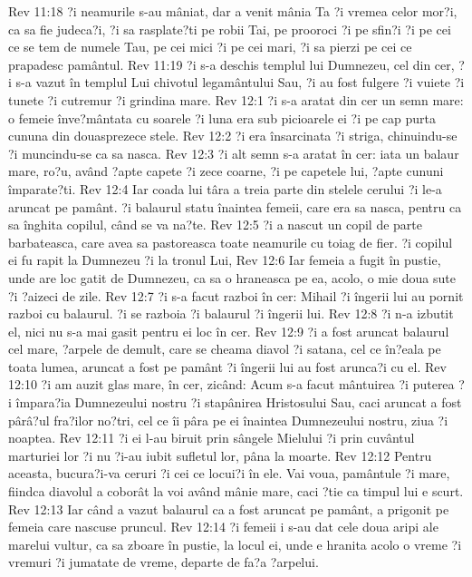Rev 11:18  ?i neamurile s-au mâniat, dar a venit mânia Ta ?i vremea celor mor?i, ca sa fie judeca?i, ?i sa rasplate?ti pe robii Tai, pe prooroci ?i pe sfin?i ?i pe cei ce se tem de numele Tau, pe cei mici ?i pe cei mari, ?i sa pierzi pe cei ce prapadesc pamântul.
Rev 11:19  ?i s-a deschis templul lui Dumnezeu, cel din cer, ?i s-a vazut în templul Lui chivotul legamântului Sau, ?i au fost fulgere ?i vuiete ?i tunete ?i cutremur ?i grindina mare.
Rev 12:1  ?i s-a aratat din cer un semn mare: o femeie înve?mântata cu soarele ?i luna era sub picioarele ei ?i pe cap purta cununa din douasprezece stele.
Rev 12:2  ?i era însarcinata ?i striga, chinuindu-se ?i muncindu-se ca sa nasca.
Rev 12:3  ?i alt semn s-a aratat în cer: iata un balaur mare, ro?u, având ?apte capete ?i zece coarne, ?i pe capetele lui, ?apte cununi împarate?ti.
Rev 12:4  Iar coada lui târa a treia parte din stelele cerului ?i le-a aruncat pe pamânt. ?i balaurul statu înaintea femeii, care era sa nasca, pentru ca sa înghita copilul, când se va na?te.
Rev 12:5  ?i a nascut un copil de parte barbateasca, care avea sa pastoreasca toate neamurile cu toiag de fier. ?i copilul ei fu rapit la Dumnezeu ?i la tronul Lui,
Rev 12:6  Iar femeia a fugit în pustie, unde are loc gatit de Dumnezeu, ca sa o hraneasca pe ea, acolo, o mie doua sute ?i ?aizeci de zile.
Rev 12:7  ?i s-a facut razboi în cer: Mihail ?i îngerii lui au pornit razboi cu balaurul. ?i se razboia ?i balaurul ?i îngerii lui.
Rev 12:8  ?i n-a izbutit el, nici nu s-a mai gasit pentru ei loc în cer.
Rev 12:9  ?i a fost aruncat balaurul cel mare, ?arpele de demult, care se cheama diavol ?i satana, cel ce în?eala pe toata lumea, aruncat a fost pe pamânt ?i îngerii lui au fost arunca?i cu el.
Rev 12:10  ?i am auzit glas mare, în cer, zicând: Acum s-a facut mântuirea ?i puterea ?i împara?ia Dumnezeului nostru ?i stapânirea Hristosului Sau, caci aruncat a fost pârâ?ul fra?ilor no?tri, cel ce îi pâra pe ei înaintea Dumnezeului nostru, ziua ?i noaptea.
Rev 12:11  ?i ei l-au biruit prin sângele Mielului ?i prin cuvântul marturiei lor ?i nu ?i-au iubit sufletul lor, pâna la moarte.
Rev 12:12  Pentru aceasta, bucura?i-va ceruri ?i cei ce locui?i în ele. Vai voua, pamântule ?i mare, fiindca diavolul a coborât la voi având mânie mare, caci ?tie ca timpul lui e scurt.
Rev 12:13  Iar când a vazut balaurul ca a fost aruncat pe pamânt, a prigonit pe femeia care nascuse pruncul.
Rev 12:14  ?i femeii i s-au dat cele doua aripi ale marelui vultur, ca sa zboare în pustie, la locul ei, unde e hranita acolo o vreme ?i vremuri ?i jumatate de vreme, departe de fa?a ?arpelui.
